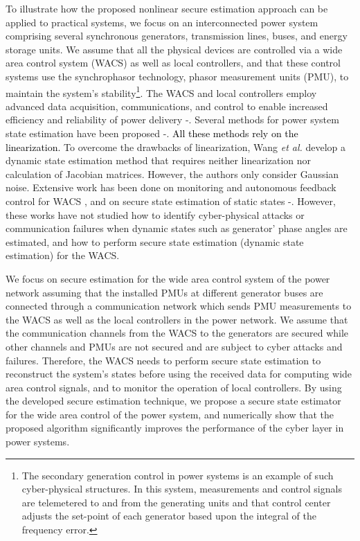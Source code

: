 To illustrate how the proposed nonlinear secure estimation approach can be applied to practical systems, we focus on an interconnected power system comprising several synchronous generators, transmission lines, buses, and energy storage units. We assume that all the physical devices are controlled via a wide area control system (WACS) as well as local controllers, and that these control systems use the synchrophasor technology, phasor measurement units (PMU), to maintain the system's stability\footnote{The secondary generation control in power systems is an example of such cyber-physical structures. In this system, measurements and control signals are telemetered to and from the generating units and that control center adjusts the set-point of each generator based upon the integral of the frequency error.}. The WACS and local controllers employ advanced data acquisition, communications, and control to enable increased efficiency and reliability of power delivery \cite{pmu_w_0}-\!\!\cite{wacs_ref8}. Several methods for power system state estimation have been proposed \cite{ref_v11}-\!\!\cite{ref_v16}. %
\textcolor{black}{All these methods rely on the linearization.} To overcome the drawbacks of linearization, Wang \textit{et al.} \cite{nonlin_est} develop a dynamic state estimation method that requires neither linearization nor calculation of Jacobian matrices. However, the authors only consider Gaussian noise. Extensive work has been done on monitoring and autonomous feedback control for WACS \cite{wacs_ref8}, and on secure state estimation of static states \cite{ref_v1}-\!\!\cite{Tong}. However, these works have not studied how to identify cyber-physical attacks or communication failures when dynamic states such as generator' phase angles are estimated, and how to perform secure state estimation (dynamic state estimation) for the WACS.

We focus on secure estimation for the wide area control system of the power network assuming that the installed PMUs at different generator buses are connected through a communication network which sends PMU measurements to the WACS as well as the local controllers in the power network. We assume that the communication channels from the WACS to the generators are secured while other channels and PMUs are not secured and are subject to cyber attacks and failures. Therefore, the WACS needs to perform secure state estimation to reconstruct the system's states before using the received data for computing wide area control signals, and to monitor the operation of local controllers. By using the developed secure estimation technique, we propose a secure state estimator for the wide area control of the power system, and numerically show that the proposed algorithm significantly improves the performance of the cyber layer in power systems.


